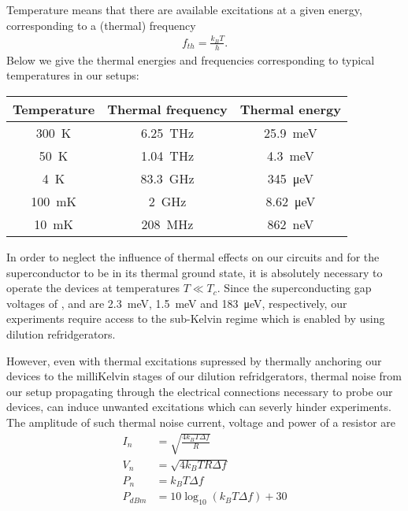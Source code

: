 Temperature means that there are available excitations at a given energy, corresponding to a (thermal) frequency
\begin{align}
f_{th}=\frac{k_B T}{h}.
\end{align}
Below we give the thermal energies and frequencies corresponding to typical temperatures in our setups:
\begin{center}
\begin{tabular}{ccc}
	\hline \hline
	Temperature & Thermal frequency & Thermal energy \\ 
	\hline 
	\SI{300}{\kelvin} & \SI{6.25}{\tera\hertz} & \SI{25.9}{\milli\electronvolt} \\ 
	\SI{50}{\kelvin} & \SI{1.04}{\tera\hertz} & \SI{4.3}{\milli\electronvolt} \\ 
	\SI{4}{\kelvin} & \SI{83.3}{\giga\hertz} & \SI{345}{\micro\electronvolt} \\ 
	\SI{100}{\milli\kelvin} & \SI{2}{\giga\hertz} & \SI{8.62}{\micro\electronvolt} \\ 
	\SI{10}{\milli\kelvin} & \SI{208}{\mega\hertz} & \SI{862}{\nano\electronvolt} \\ 
	\hline \hline
\end{tabular}
\end{center}

In order to neglect the influence of thermal effects on our circuits and for the superconductor to be in its thermal ground state, it is absolutely necessary to operate the devices at temperatures $T \ll T_c$.
Since the superconducting gap voltages of ,  and  are \SI{2.3}{\milli\electronvolt}, \SI{1.5}{\milli\electronvolt} and \SI{183}{\micro\electronvolt}, respectively, our experiments require access to the sub-Kelvin regime which is enabled by using dilution refridgerators.

However, even with thermal excitations supressed by thermally anchoring our devices to the milliKelvin stages of our dilution refridgerators, thermal noise from our setup propagating through the electrical connections necessary to probe our devices, can induce unwanted excitations which can severly hinder experiments.
The amplitude of such thermal noise current, voltage and power of a resistor are
\begin{align}
I_n &= \sqrt{\frac{4k_B T\Delta f}{R}} \\
V_n &= \sqrt{4k_B T R\Delta f} \\
P_n &= k_B T \Delta f \\
P_{dBm} &= 10\log_{10}(k_B T\Delta f)+30
\end{align}

